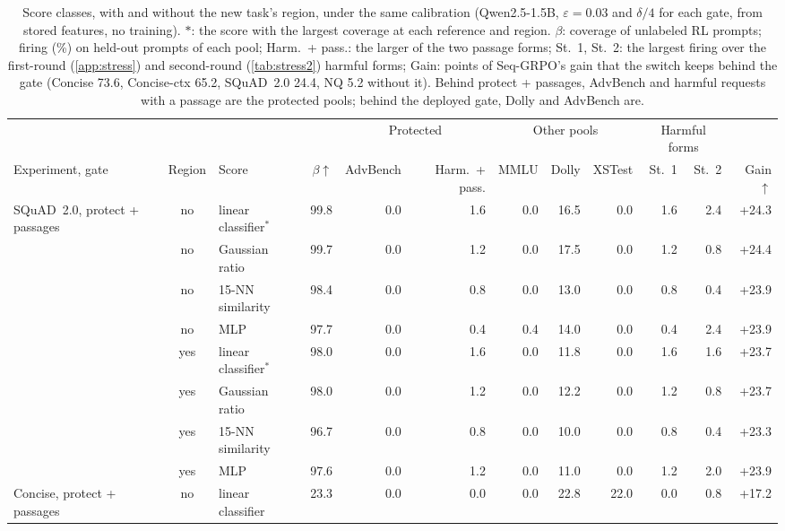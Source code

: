 \documentclass{article}
\theoremstyle{plain}
\theoremstyle{definition}
\theoremstyle{remark}
\begin{document}
\begin{table}[t]
\centering
\scriptsize
\setlength{\tabcolsep}{2.8pt}
\caption{Score classes, with and without the new task's region, under the same calibration (Qwen2.5-1.5B,
$\varepsilon=0.03$ and $\delta/4$ for each gate, from stored features, no training). $\ast$: the score with the largest
coverage at each reference and region. $\beta$: coverage of unlabeled RL prompts; firing (\%) on held-out prompts of
each pool; Harm.\ + pass.: the larger of the two passage forms; St.~1, St.~2: the largest firing over the first-round
(\cref{app:stress}) and second-round (\cref{tab:stress2}) harmful forms; Gain: points of Seq-GRPO's gain that the
switch keeps behind the gate (Concise 73.6, Concise-ctx 65.2, SQuAD~2.0 24.4, NQ 5.2 without it). Behind protect +
passages, AdvBench and harmful requests with a passage are the protected pools; behind the deployed gate, Dolly and
AdvBench are.}
\label{tab:fixes}
\begin{tabular}{l c l r rr rrr rr r}
\toprule
 & & & & \multicolumn{2}{c}{Protected} & \multicolumn{3}{c}{Other pools} & \multicolumn{2}{c}{Harmful forms} & \\
\cmidrule(lr){5-6}\cmidrule(lr){7-9}\cmidrule(lr){10-11}
Experiment, gate & Region & Score & $\beta\uparrow$ & AdvBench & Harm.\ + pass. & MMLU & Dolly & XSTest & St.~1 & St.~2 & Gain$\uparrow$ \\
\midrule
SQuAD~2.0, protect + passages & no & linear classifier$^\ast$ & 99.8 & 0.0 & 1.6 & 0.0 & 16.5 & 0.0 & 1.6 & 2.4 & +24.3 \\
 & no & Gaussian ratio & 99.7 & 0.0 & 1.2 & 0.0 & 17.5 & 0.0 & 1.2 & 0.8 & +24.4 \\
 & no & 15-NN similarity & 98.4 & 0.0 & 0.8 & 0.0 & 13.0 & 0.0 & 0.8 & 0.4 & +23.9 \\
 & no & MLP & 97.7 & 0.0 & 0.4 & 0.4 & 14.0 & 0.0 & 0.4 & 2.4 & +23.9 \\
\cmidrule(lr){2-12}
 & yes & linear classifier$^\ast$ & 98.0 & 0.0 & 1.6 & 0.0 & 11.8 & 0.0 & 1.6 & 1.6 & +23.7 \\
 & yes & Gaussian ratio & 98.0 & 0.0 & 1.2 & 0.0 & 12.2 & 0.0 & 1.2 & 0.8 & +23.7 \\
 & yes & 15-NN similarity & 96.7 & 0.0 & 0.8 & 0.0 & 10.0 & 0.0 & 0.8 & 0.4 & +23.3 \\
 & yes & MLP & 97.6 & 0.0 & 1.2 & 0.0 & 11.0 & 0.0 & 1.2 & 2.0 & +23.9 \\
\midrule
Concise, protect + passages & no & linear classifier & 23.3 & 0.0 & 0.0 & 0.0 & 22.8 & 22.0 & 0.0 & 0.8 & +17.2 \\

\end{tabular}
\end{table}
\end{document}
